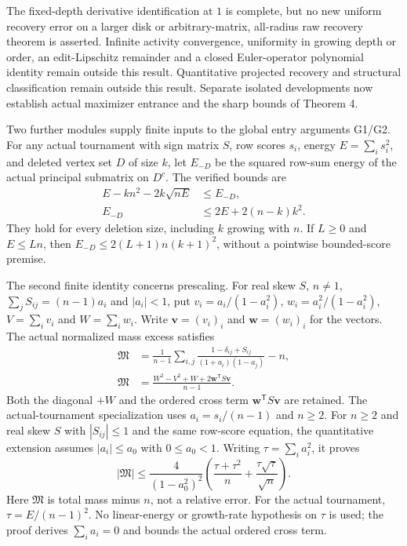 \documentclass[11pt]{article}
\begin{document}
The fixed-depth derivative identification at $1$ is complete, but no new uniform recovery error on a larger disk or arbitrary-matrix, all-radius raw recovery theorem is asserted. Infinite activity convergence, uniformity in growing depth or order, an edit-Lipschitz remainder and a closed Euler-operator polynomial identity remain outside this result. Quantitative projected recovery and structural classification remain outside this result. Separate isolated developments now establish actual maximizer entrance and the sharp bounds of Theorem 4.

Two further modules supply finite inputs to the global entry arguments G1/G2. For any actual tournament with sign matrix $S$, row scores $s_i$, energy $E=\sum_i s_i^2$, and deleted vertex set $D$ of size $k$, let $E_{-D}$ be the squared row-sum energy of the actual principal submatrix on $D^c$. The verified bounds are
\[
 \begin{aligned}
 E-kn^2-2k\sqrt{nE}&\le E_{-D},\\
 E_{-D}&\le2E+2(n-k)k^2.
 \end{aligned}
\]
They hold for every deletion size, including $k$ growing with $n$. If $L\ge0$ and $E\le Ln$, then $E_{-D}\le2(L+1)n(k+1)^2$, without a pointwise bounded-score premise.

The second finite identity concerns prescaling. For real skew $S$, $n\ne1$, $\sum_jS_{ij}=(n-1)a_i$ and $|a_i|<1$, put $v_i=a_i/(1-a_i^2)$, $w_i=a_i^2/(1-a_i^2)$, $V=\sum_iv_i$ and $W=\sum_iw_i$. Write $\mathbf v=(v_i)_i$ and $\mathbf w=(w_i)_i$ for the vectors. The actual normalized mass excess satisfies
\[
 \begin{aligned}
 \mathfrak M&=\frac1{n-1}\sum_{i,j}
 \frac{1-\delta_{ij}+S_{ij}}{(1+a_i)(1-a_j)}-n,\\
 \mathfrak M&=\frac{W^2-V^2+W+2\mathbf w^{\mathsf T}S\mathbf v}{n-1}.
 \end{aligned}
\]
Both the diagonal $+W$ and the ordered cross term $\mathbf w^{\mathsf T}S\mathbf v$ are retained. The actual-tournament specialization uses $a_i=s_i/(n-1)$ and $n\ge2$. For $n\ge2$ and real skew $S$ with $|S_{ij}|\le1$ and the same row-score equation, the quantitative extension assumes $|a_i|\le a_0$ with $0\le a_0<1$. Writing $\tau=\sum_i a_i^2$, it proves
\[
 |\mathfrak M|\le\frac{4}{(1-a_0^2)^2}
 \left(\frac{\tau+\tau^2}{n}+\frac{\tau\sqrt\tau}{\sqrt n}\right).
\]
Here $\mathfrak M$ is total mass minus $n$, not a relative error. For the actual tournament, $\tau=E/(n-1)^2$. No linear-energy or growth-rate hypothesis on $\tau$ is used; the proof derives $\sum_i a_i=0$ and bounds the actual ordered cross term.
\end{document}

